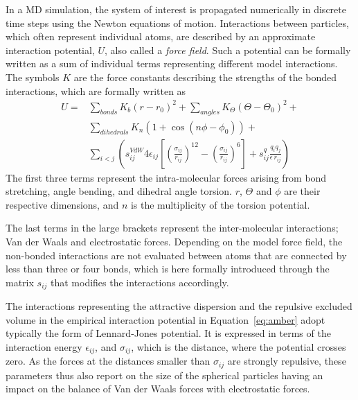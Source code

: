 In a MD simulation, the system of interest is propagated numerically in discrete time steps using
the Newton equations of motion. 
Interactions between particles, which often represent individual atoms, 
are described by an approximate interaction potential, $U$, also called a \emph{force field}. 
Such a potential can be formally written as a sum of individual terms representing different model interactions.
The symbols $K$ are the force constants describing the strengths of the bonded interactions,
which are formally written as
\begin{eqnarray}  \label{eq:amber}
  U = & \displaystyle \sum _{bonds} K_b (r-r_{0})^2 + \sum _{angles} K_\Theta (\Theta-\Theta_{0})^2 + \\ \nonumber
      & \displaystyle \sum _{dihedrals} K_n (1+\cos(n\phi -\phi_0)) + \\ \nonumber
      & \displaystyle \sum _{i<j} \left ( s_{ij} ^{VdW} 4 \epsilon _{ij} \left [ \left (\frac{\sigma _{ij}}{r_{ij}} \right )^{12} - \left ( \frac{\sigma _{ij}}{r_{ij}} \right )^6 \right ] + s_{ij}^q \frac{q_i q_j}{\epsilon \, r_{ij}} \right )
\end{eqnarray}
The first three terms represent the intra-molecular forces arising from bond stretching, angle bending, and dihedral angle torsion. 
$r$, $\Theta$ and $\phi$ are their respective dimensions,
and $n$ is the multiplicity of the torsion potential. 

The last terms in the large brackets represent the inter-molecular interactions; 
 Van der Waals and electrostatic forces. 
Depending on the model force field, the non-bonded interactions 
are not evaluated between atoms that are connected by less than three or four bonds, 
which is here formally introduced through the matrix $s_{ij}$ that modifies the interactions accordingly.

The interactions representing the 
attractive dispersion and the repulsive excluded volume 
in the empirical interaction potential in Equation~\ref{eq:amber} 
adopt typically the form of Lennard-Jones potential. 
It is expressed in terms of the interaction energy $\epsilon_{ij}$, 
and $\sigma_{ij}$, 
which is the distance,
where the potential crosses zero. 
As the forces at the distances smaller than $\sigma _{ij}$ are strongly repulsive,
these parameters thus also report on the size of the spherical particles
having an impact on the balance of Van der Waals forces with electrostatic forces.


